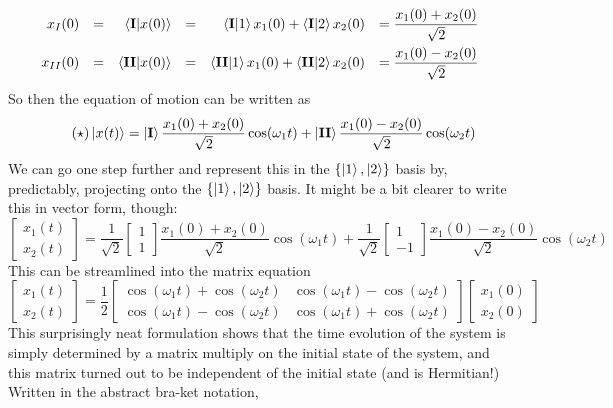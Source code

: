 \documentclass{article}
\begin{document}
\begin{align*}
\begin{aligned}
x_I(0) &&=&& \braket{\textbf{I}|x(0)} && = &&\braket{\textbf{I}|1}x_1(0) + \braket{\textbf{I}|2}x_2(0) && = \frac{x_1(0) + x_2(0)}{\sqrt{2}} \\
x_{II}(0) &&=&& \braket{\textbf{II}|x(0)} && = &&\braket{\textbf{II}|1}x_1(0) + \braket{\textbf{II}|2}x_2(0) && = \frac{x_1(0) - x_2(0)}{\sqrt{2}}
\end{aligned}
\end{align*}
So then the equation of motion can be written as 
\begin{equation}\label{eqn:star}\tag{$\star$} \ket{x(t)} = \ket{\textbf{I}}\frac{x_1(0) + x_2(0)}{\sqrt{2}}\cos(\omega_1 t) + \ket{\textbf{II}}\frac{x_1(0) - x_2(0)}{\sqrt{2}}\cos(\omega_2 t) \end{equation} 
We can go one step further and represent this in the $\{\ket{1}, \ket{2}\}$ basis by, predictably, projecting onto the $\{\ket{1}, \ket{2}\}$ basis. It might be a bit clearer to write this in vector form, though:
\[ \begin{bmatrix} x_1(t) \\ x_2(t) \end{bmatrix} = \frac{1}{\sqrt{2}}\begin{bmatrix} 1 \\ 1 \end{bmatrix} \frac{x_1(0) + x_2(0)}{\sqrt{2}}\cos(\omega_1 t) + \frac{1}{\sqrt{2}}\begin{bmatrix} 1 \\ -1 \end{bmatrix}\frac{x_1(0) - x_2(0)}{\sqrt{2}}\cos(\omega_2 t) \]
This can be streamlined into the matrix equation
\[\begin{bmatrix} x_1(t) \\ x_2(t) \end{bmatrix} =
\frac{1}{2}
 \begin{bmatrix}
\cos(\omega_1 t) + \cos(\omega_2 t) &\cos(\omega_1 t) - \cos(\omega_2 t) \\
\cos(\omega_1 t) - \cos(\omega_2 t) & \cos(\omega_1 t) + \cos(\omega_2 t)
 \end{bmatrix}\begin{bmatrix}x_1(0) \\ x_2(0)\end{bmatrix}\]
This surprisingly neat formulation shows that the time evolution of the system is simply determined by a matrix multiply on the initial state of the system, and this matrix turned out to be independent of the initial state (and is Hermitian!) Written in the abstract bra-ket notation, 
\end{document}
